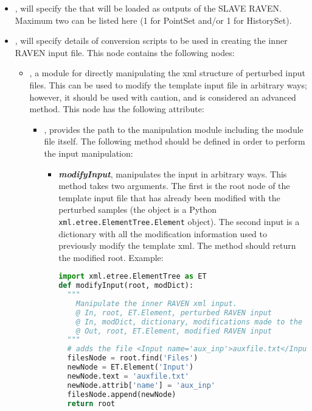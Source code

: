 \begin{itemize} %
  \item  {},  will specify the   that will be loaded as outputs of the SLAVE RAVEN.
    Maximum two   can be listed here (1 for PointSet and/or 1 for HistorySet).
  \item  {},  will specify details of conversion scripts to
    be used in creating the inner RAVEN input file.  This node contains the following nodes:
    \begin{itemize} %
      \item {},  a module for directly manipulating the xml
        structure of perturbed input files. This can be used to modify the template input file in arbitrary
        ways; however, it should be used with caution, and is considered an advanced method.
        This node has the following attribute:
        \begin{itemize} %
          \item {},  provides the path to the manipulation module including
              the module file itself.  The following method should be defined in order to perform the input
              manipulation:
              \begin{itemize} %
                 \item \textbf{\textit{modifyInput}}, manipulates the input in arbitrary ways. This method
                   takes two arguments. The first is the root  node of the template input
                   file that has already been modified with the perturbed samples (the object is a Python
                   \texttt{xml.etree.ElementTree.Element} object). The second input is a dictionary with all
                   the modification information used to previously modify the template xml. The method should
                   return the modified root.
                 Example:
                  \begin{lstlisting}[language=python]
import xml.etree.ElementTree as ET
def modifyInput(root, modDict):
  """
    Manipulate the inner RAVEN xml input.
    @ In, root, ET.Element, perturbed RAVEN input
    @ In, modDict, dictionary, modifications made to the input
    @ Out, root, ET.Element, modified RAVEN input
  """
  # adds the file <Input name='aux_inp'>auxfile.txt</Input> to the <Files> node
  filesNode = root.find('Files')
  newNode = ET.Element('Input')
  newNode.text = 'auxfile.txt'
  newNode.attrib['name'] = 'aux_inp'
  filesNode.append(newNode)
  return root
                   \end{lstlisting}
              \end{itemize} %
        \end{itemize} %


\end{itemize}
\end{itemize}
